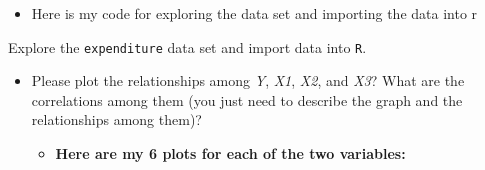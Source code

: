 \documentclass[12pt,letterpaper]{article}
\begin{document}
\begin{itemize}
	\item Here is my code for exploring the data set and importing the data into r
	
 

\end{itemize}

\vspace{.5cm}
\noindent Explore the \texttt{expenditure} data set and import data into \texttt{R}.
\vspace{.5cm}
  
\vspace{.5cm}
\begin{itemize}

\item
Please plot the relationships among \emph{Y}, \emph{X1}, \emph{X2}, and \emph{X3}? What are the correlations among them (you just need to describe the graph and the relationships among them)?
	\begin{itemize}
	\item \textbf{Here are my 6 plots for each of the two variables:}
	

\end{itemize}
\end{itemize}
\end{document}
